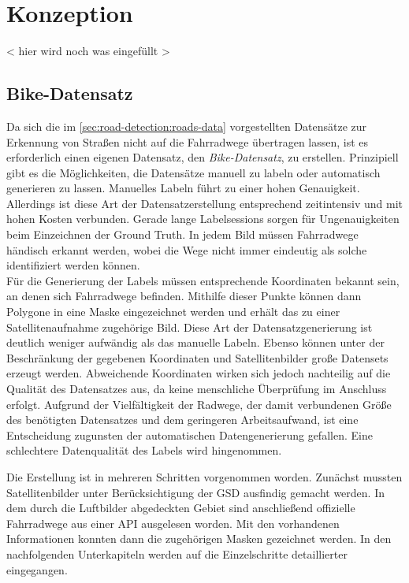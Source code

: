 \chapter{Konzeption} %

< hier wird noch was eingefüllt > 

\section{Bike-Datensatz} \label{sec:bike-data}

Da sich die im \autoref{sec:road-detection:roads-data} vorgestellten Datensätze zur Erkennung von Straßen nicht auf die Fahrradwege übertragen lassen, 
ist es erforderlich einen eigenen Datensatz, den \textit{Bike-Datensatz}, zu erstellen.
Prinzipiell gibt es die Möglichkeiten, die Datensätze manuell zu labeln oder automatisch generieren zu lassen.
Manuelles Labeln führt zu einer hohen Genauigkeit.
Allerdings ist diese Art der Datensatzerstellung entsprechend zeitintensiv und mit hohen Kosten verbunden.
Gerade lange Labelsessions sorgen für Ungenauigkeiten beim Einzeichnen der Ground Truth. 
In jedem Bild müssen Fahrradwege händisch erkannt werden, wobei die Wege nicht immer eindeutig als solche identifiziert werden können.\\
Für die Generierung der Labels müssen entsprechende Koordinaten bekannt sein, an denen sich Fahrradwege befinden.
Mithilfe dieser Punkte können dann Polygone in eine Maske eingezeichnet werden und erhält das zu einer Satellitenaufnahme zugehörige Bild.
Diese Art der Datensatzgenerierung ist deutlich weniger aufwändig als das manuelle Labeln. 
Ebenso können unter der Beschränkung der gegebenen Koordinaten und Satellitenbilder große Datensets erzeugt werden.
Abweichende Koordinaten wirken sich jedoch nachteilig auf die Qualität des Datensatzes aus, da keine menschliche Überprüfung im Anschluss erfolgt.
Aufgrund der Vielfältigkeit der Radwege, der damit verbundenen Größe des benötigten Datensatzes und dem geringeren Arbeitsaufwand, ist eine Entscheidung zugunsten der automatischen Datengenerierung gefallen.
Eine schlechtere Datenqualität des Labels wird hingenommen.

Die Erstellung ist in mehreren Schritten vorgenommen worden.
Zunächst mussten Satellitenbilder unter Berücksichtigung der \ac{GSD} ausfindig gemacht werden.
In dem durch die Luftbilder abgedeckten Gebiet sind anschließend offizielle Fahrradwege aus einer API ausgelesen worden.
Mit den vorhandenen Informationen konnten dann die zugehörigen Masken gezeichnet werden.
In den nachfolgenden Unterkapiteln werden auf die Einzelschritte detaillierter eingegangen.


